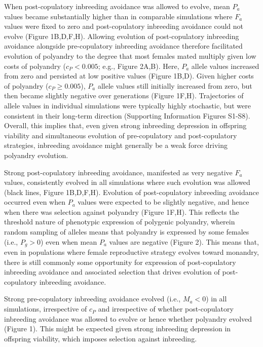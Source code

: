 \documentclass[12pt]{article}
\begin{document}
When post-copulatory inbreeding avoidance was allowed to evolve, mean $P_{a}$ values became substantially higher than in comparable simulations where $F_{a}$ values were fixed to zero and post-copulatory inbreeding avoidance could not evolve (Figure 1B,D,F,H). Allowing evolution of post-copulatory inbreeding avoidance alongside pre-copulatory inbreeding avoidance therefore facilitated evolution of polyandry to the degree that most females mated multiply given low costs of polyandry ($c_{P} < 0.005$; e.g., Figure 2A,B). Here, $P_{a}$ allele values increased from zero and persisted at low positive values (Figure 1B,D). Given higher costs of polyandry ($c_{P} \geq 0.005$), $P_{a}$ allele values still initially increased from zero, but then became slightly negative over generations (Figure 1F,H). Trajectories of allele values in individual simulations were typically highly stochastic, but were consistent in their long-term direction (Supporting Information Figures S1-S8). Overall, this implies that, even given strong inbreeding depression in offspring viability and simultaneous evolution of pre-copulatory and post-copulatory strategies, inbreeding avoidance might generally be a weak force driving polyandry evolution.

Strong post-copulatory inbreeding avoidance, manifested as very negative $F_{a}$ values, consistently evolved in all simulations where such evolution was allowed (black lines, Figure 1B,D,F,H). Evolution of post-copulatory inbreeding avoidance occurred even when $P_{a}$ values were expected to be slightly negative, and hence when there was selection against polyandry (Figure 1F,H). This reflects the threshold nature of phenotypic expression of polygenic polyandry, wherein random sampling of alleles means that polyandry is expressed by some females (i.e., $P_{g}>0$) even when mean $P_{a}$ values are negative (Figure 2). This means that, even in populations where female reproductive strategy evolves toward monandry, there is still commonly some opportunity for expression of post-copulatory inbreeding avoidance and associated selection that drives evolution of post-copulatory inbreeding avoidance.

Strong pre-copulatory inbreeding avoidance evolved (i.e., $M_{a}<0$) in all simulations, irrespective of $c_{P}$ and irrespective of whether post-copulatory inbreeding avoidance was allowed to evolve or hence whether polyandry evolved (Figure 1). This might be expected given strong inbreeding depression in offspring viability, which imposes selection against inbreeding.
\end{document}
